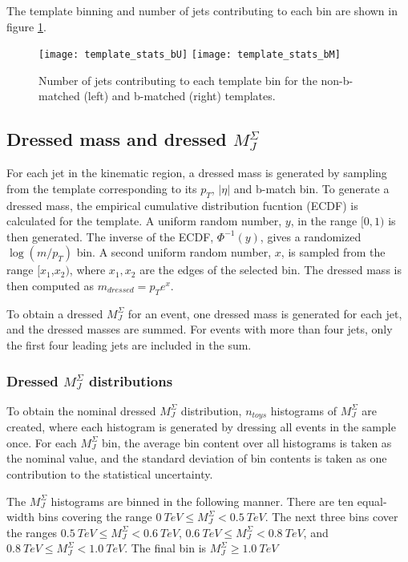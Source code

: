 The template binning and number of jets contributing to each bin are
shown in figure \ref{fig:template_stats}.

\begin{figure}[h]
\texttt{[image: template\_stats\_bU]}
\texttt{[image: template\_stats\_bM]}
\caption{Number of jets contributing to each template bin for the
  non-b-matched (left) and b-matched (right) templates.}
\label{fig:template_stats}
\end{figure}

\subsection{Dressed mass and dressed $M_{J}^{\Sigma}$}
For each jet in the kinematic region, a dressed mass is generated by sampling from
the template corresponding to its $p_T$, $|\eta|$ and b-match bin. To
generate a dressed mass, the empirical cumulative distribution fucntion (ECDF)
is calculated for the template. A uniform random number, $y$, in the
range $[0,1)$ is then
generated. The inverse of the ECDF, $\Phi^{-1}(y)$, gives a randomized
$\log\left(m/p_T\right)$ bin. A second uniform random number, $x$, is sampled from the range
$[x_1$,$x_2)$, where $x_1,x_2$ are the edges of the selected bin. The
dressed mass is then computed as $m_{dressed} = p_{T}e^x$.

To obtain a dressed $M_{J}^{\Sigma}$ for an event, one dressed mass is
generated for each jet, and the dressed masses are summed. For
events with more than four jets, only the first four leading jets are
included in the sum.

\subsubsection{Dressed $M_{J}^{\Sigma}$ distributions}
To obtain the nominal dressed $M_{J}^{\Sigma}$ distribution,
$n_{toys}$ histograms of $M_{J}^{\Sigma}$ are created, where each
histogram is generated by dressing all events in the sample once. For
each $M_{J}^{\Sigma}$ bin, the average bin content over all histograms is taken
as the nominal value, and the standard deviation of bin contents is
taken as one contribution to the statistical uncertainty.

The $M_{J}^{\Sigma}$ histograms are binned in the following
manner. There are ten equal-width bins covering the range $0~TeV \leq M_{J}^{\Sigma} <
0.5~TeV$. The next three bins cover the ranges $0.5~TeV \leq M_{J}^{\Sigma} <
0.6~TeV$, $0.6~TeV \leq M_{J}^{\Sigma} <
0.8~TeV$, and $0.8~TeV \leq M_{J}^{\Sigma} <
1.0~TeV$. The final bin is $M_{J}^{\Sigma} \geq
1.0~TeV$

